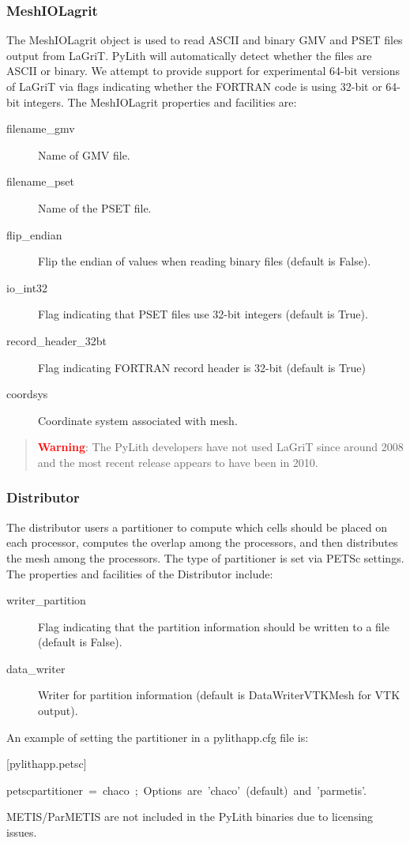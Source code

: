 \subsubsection{\label{sec:MeshIOLagrit}MeshIOLagrit}

The MeshIOLagrit object is used to read ASCII and binary GMV and PSET
files output from LaGriT. PyLith will automatically detect whether
the files are ASCII or binary. We attempt to provide support for experimental
64-bit versions of LaGriT via flags indicating whether the FORTRAN
code is using 32-bit or 64-bit integers. The MeshIOLagrit properties
and facilities are:
\begin{description}
\item [{filename\_gmv}] Name of GMV file.
\item [{filename\_pset}] Name of the PSET file.
\item [{flip\_endian}] Flip the endian of values when reading binary files
(default is False).
\item [{io\_int32}] Flag indicating that PSET files use 32-bit integers
(default is True).
\item [{record\_header\_32bt}] Flag indicating FORTRAN record header is
32-bit (default is True)
\item [{coordsys}] Coordinate system associated with mesh.\end{description}
\begin{quote}
\textbf{\textcolor{red}{Warning}}: The PyLith developers have not
used LaGriT since around 2008 and the most recent release appears
to have been in 2010.
\end{quote}

\subsubsection{Distributor}

The distributor users a partitioner to compute which cells should
be placed on each processor, computes the overlap among the processors,
and then distributes the mesh among the processors. The type of partitioner
is set via PETSc settings. The properties and facilities of the Distributor
include:
\begin{description}
\item [{writer\_partition}] Flag indicating that the partition information
should be written to a file (default is False).
\item [{data\_writer}] Writer for partition information (default is DataWriterVTKMesh
for VTK output).
\end{description}
An example of setting the partitioner in a pylithapp.cfg file is:
\begin{lyxcode}
{[}pylithapp.petsc{]}

petscpartitioner~=~chaco~;~Options~are~'chaco'~(default)~and~'parmetis'.
\end{lyxcode}
METIS/ParMETIS are not included in the PyLith binaries due to licensing
issues. 


